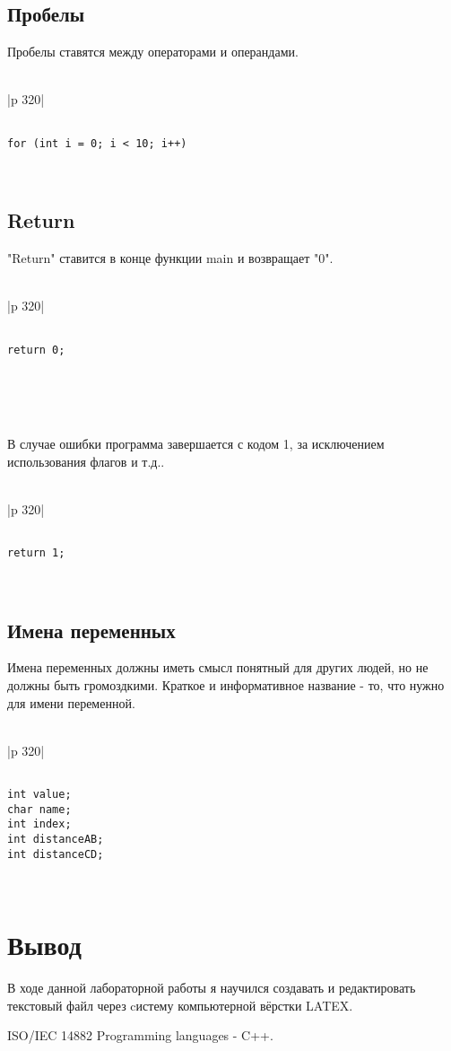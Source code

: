 \documentclass{article}
\begin{document}
\subsection{Пробелы}
Пробелы ставятся между операторами и операндами.\\
\\
\begin{tabular}{|p {320}|}
\hline
\begin{verbatim}

for (int i = 0; i < 10; i++)

\end{verbatim}
\\
\hline      
\end{tabular}

\subsection{Return}
"Return" ставится в конце функции main и возвращает "0".\\
\\
\begin{tabular}{|p {320}|}
\hline
\begin{verbatim}

return 0;

\end{verbatim}
\\
\hline      
\end{tabular}
\\
\\
В случае ошибки программа завершается с кодом 1, за исключением использования флагов и т.д..\\
\\
\begin{tabular}{|p {320}|}
\hline
\begin{verbatim}

return 1;

\end{verbatim}
\\
\hline      
\end{tabular}

\subsection{Имена переменных}
Имена переменных должны иметь смысл понятный для других людей, но не должны быть громоздкими.
Краткое и информативное название - то, что нужно для имени переменной. \\
\\
\begin{tabular}{|p {320}|}
\hline
\begin{verbatim}

int value;
char name;
int index;
int distanceAB;
int distanceCD;

\end{verbatim}
\\
\hline      
\end{tabular}
\section{Вывод}
В ходе данной лабораторной работы я научился создавать и редактировать текстовый файл через cистему компьютерной вёрстки LATEX.  
\begin{thebibliography}{1}
ISO/IEC 14882 Programming languages - C++.\\
\end{thebibliography}
\end{document}
